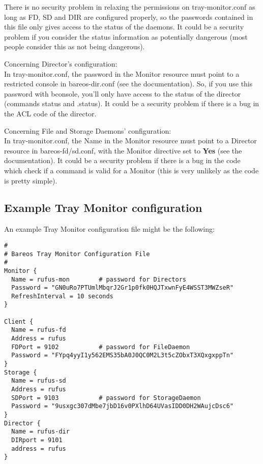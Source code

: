 There is no security problem in relaxing the permissions on
tray-monitor.conf as long as FD, SD and DIR are configured properly, so
the passwords contained in this file only gives access to the status of
the daemons. It could be a security problem if you consider the status
information as potentially dangerous
(most people consider this as not being dangerous).

Concerning Director's configuration: \\
In tray-monitor.conf, the password in the Monitor resource must point to
a restricted console in bareos-dir.conf (see the documentation). So, if
you use this password with bconsole, you'll only have access to the
status of the director (commands status and .status).
It could be a security problem if there is a bug in the ACL code of the
director.

Concerning File and Storage Daemons' configuration:\\
In tray-monitor.conf, the Name in the Monitor resource must point to a
Director resource in bareos-fd/sd.conf, with the Monitor directive set
to {\bf Yes} (see the documentation).
It could be a security problem if there is a bug in the code which check
if a command is valid for a Monitor (this is very unlikely as the code
is pretty simple).


\subsection*{Example Tray Monitor configuration}


An example Tray Monitor configuration file might be the following:

\footnotesize
\begin{verbatim}
#
# Bareos Tray Monitor Configuration File
#
Monitor {
  Name = rufus-mon        # password for Directors
  Password = "GN0uRo7PTUmlMbqrJ2Gr1p0fk0HQJTxwnFyE4WSST3MWZseR"
  RefreshInterval = 10 seconds
}

Client {
  Name = rufus-fd
  Address = rufus
  FDPort = 9102           # password for FileDaemon
  Password = "FYpq4yyI1y562EMS35bA0J0QC0M2L3t5cZObxT3XQxgxppTn"
}
Storage {
  Name = rufus-sd
  Address = rufus
  SDPort = 9103           # password for StorageDaemon
  Password = "9usxgc307dMbe7jbD16v0PXlhD64UVasIDD0DH2WAujcDsc6"
}
Director {
  Name = rufus-dir
  DIRport = 9101
  address = rufus
}
\end{verbatim}
\normalsize

